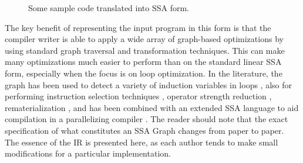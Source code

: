 \begin{figure}[ht]
\centering
{}
\caption{Some sample code translated into SSA form.}
\label{fig: ssa-graph-example-code}
\end{figure}

The key benefit of representing the input program in this form is that the compiler writer is able to apply a wide array of graph-based optimizations by using standard graph traversal and transformation techniques. This can make many optimizations much easier to perform than on the standard linear SSA form, especially when the focus is on loop optimization. In the literature, the graph has been used to detect a variety of induction variables in loops \cite{143131,201003}, also for performing instruction selection techniques \cite{1375663,1269857}, operator strength reduction \cite{504710}, rematerialization \cite{143143}, and has been combined with an extended SSA language to aid compilation in a parallelizing compiler \cite{Stoltz_extendedssa}. The reader should note that the exact specification of what constitutes an SSA Graph changes from paper to paper. The essence of the IR is presented here, as each author tends to make small modifications for a particular implementation.

